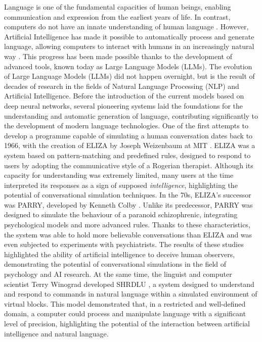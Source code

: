 Language is one of the fundamental capacities of human beings, enabling communication and expression from the earliest years of life. In contrast, computers do not have an innate understanding of human language \cite{zhao2025surveylargelanguagemodels}.
However, Artificial Intelligence has made it possible to automatically process and generate language, allowing computers to interact with humans in an increasingly natural way \cite{Turing1950}.
This progress has been made possible thanks to the development of advanced tools, known today as Large Language Models (LLMs).
The evolution of Large Language Models (LLMs) did not happen overnight, but is the result of decades of research in the fields of Natural Language Processing (NLP) \cite{NLP} and Artificial Intelligence.
Before the introduction of the current models based on deep neural networks, several pioneering systems laid the foundations for the understanding and automatic generation of language, contributing significantly to the development of modern language technologies.
One of the first attempts to develop a programme capable of simulating a human conversation dates back to 1966, with the creation of ELIZA by Joseph Weizenbaum at MIT \cite{Segal_2025}.
ELIZA was a system based on pattern-matching \cite{PatternMatching} and predefined rules, designed to respond to users by adopting the communicative style of a Rogerian therapist.
Although its capacity for understanding was extremely limited, many users at the time interpreted its responses as a sign of supposed \textit{intelligence}, highlighting the potential of conversational simulation techniques.
In the 70s, ELIZA's successor was PARRY, developed by Kenneth Colby \cite{parry2025}.
Unlike its predecessor, PARRY was designed to simulate the behaviour of a paranoid schizophrenic, integrating psychological models and more advanced rules. Thanks to these characteristics, the system was able to hold more believable conversations than ELIZA and was even subjected to experiments with psychiatrists. The results of these studies highlighted the ability of artificial intelligence to deceive human observers, demonstrating the potential of conversational simulations in the field of psychology and AI research.
At the same time, the linguist and computer scientist Terry Winograd developed SHRDLU \cite{winograd2025}, a system designed to understand and respond to commands in natural language within a simulated environment of virtual blocks.
This model demonstrated that, in a restricted and well-defined domain, a computer could process and manipulate language with a significant level of precision, highlighting the potential of the interaction between artificial intelligence and natural language.
